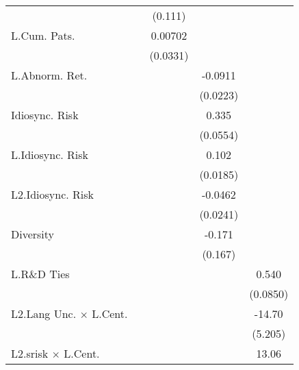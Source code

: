 \begin{table}
\begin{center}
{\begin{tabular}{l*{4}{c}}
                    &                     &     (0.111)         &                     &                     \\
L.Cum. Pats.        &                     &     0.00702         &                     &                     \\
                    &                     &    (0.0331)         &                     &                     \\
L.Abnorm. Ret.      &                     &                     &     -0.0911\sym{***}&                     \\
                    &                     &                     &    (0.0223)         &                     \\
Idiosync. Risk      &                     &                     &       0.335\sym{***}&                     \\
                    &                     &                     &    (0.0554)         &                     \\
L.Idiosync. Risk    &                     &                     &       0.102\sym{***}&                     \\
                    &                     &                     &    (0.0185)         &                     \\
L2.Idiosync. Risk   &                     &                     &     -0.0462\sym{+}  &                     \\
                    &                     &                     &    (0.0241)         &                     \\
Diversity           &                     &                     &      -0.171         &                     \\
                    &                     &                     &     (0.167)         &                     \\
L.R\&D Ties         &                     &                     &                     &       0.540\sym{***}\\
                    &                     &                     &                     &    (0.0850)         \\
L2.Lang Unc. $\times$ L.Cent.&                     &                     &                     &      -14.70\sym{**} \\
                    &                     &                     &                     &     (5.205)         \\
L2.srisk $\times$ L.Cent.&                     &                     &                     &       13.06\sym{**} \\

\end{tabular}}
\end{center}
\end{table}
